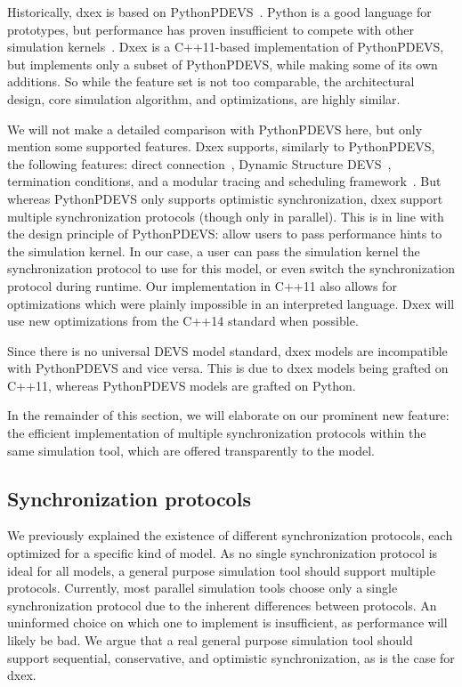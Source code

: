 Historically, dxex is based on PythonPDEVS~\cite{PythonPDEVS}.
Python is a good language for prototypes, but performance has proven insufficient to compete with other simulation kernels~\cite{MasterThesis}.
Dxex is a C++11-based implementation of PythonPDEVS, but implements only a subset of PythonPDEVS, while making some of its own additions.
So while the feature set is not too comparable, the architectural design, core simulation algorithm, and optimizations, are highly similar.

We will not make a detailed comparison with PythonPDEVS here, but only mention some supported features.
Dxex supports, similarly to PythonPDEVS, the following features: direct connection~\cite{SymbolicFlattening}, \textsf{Dynamic Structure DEVS}~\cite{DSDEVS}, termination conditions, and a modular tracing and scheduling framework~\cite{PythonPDEVS}.
But whereas PythonPDEVS only supports optimistic synchronization, dxex support multiple synchronization protocols (though only in parallel).
This is in line with the design principle of PythonPDEVS: allow users to pass performance hints to the simulation kernel.
In our case, a user can pass the simulation kernel the synchronization protocol to use for this model, or even switch the synchronization protocol during runtime.
Our implementation in C++11 also allows for optimizations which were plainly impossible in an interpreted language. Dxex will use new optimizations from the C++14 standard when possible.

Since there is no universal \textsf{DEVS} model standard, dxex models are incompatible with PythonPDEVS and vice versa.
This is due to dxex models being grafted on C++11, whereas PythonPDEVS models are grafted on Python.

In the remainder of this section, we will elaborate on our prominent new feature: the efficient implementation of multiple synchronization protocols within the same simulation tool, which are offered transparently to the model.

\subsection{Synchronization protocols}
We previously explained the existence of different synchronization protocols, each optimized for a specific kind of model.
As no single synchronization protocol is ideal for all models, a general purpose simulation tool should support multiple protocols.
Currently, most parallel simulation tools choose only a single synchronization protocol due to the inherent differences between protocols.
An uninformed choice on which one to implement is insufficient, as performance will likely be bad.
We argue that a real general purpose simulation tool should support sequential, conservative, and optimistic synchronization, as is the case for dxex.

